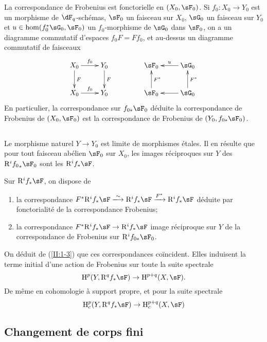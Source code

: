 La correspondance de Frobenius est fonctorielle en $(X_0,\sF_0)$. Si 
$f_0:X_0\to Y_0$ est un morphisme de $\dF_q$-schémas, $\sF_0$ un faisceau sur 
$X_0$, $\sG_0$ un faisceau sur $Y_0$ et $u\in\hom(f_0^*\sG_0,\sF_0)$ un 
$f_0$-morphisme de $\sG_0$ dans $\sF_0$, on a un diagramme commutatif d'espaces 
$f_0 F = F f_0$, et au-dessus un diagramme commutatif de faisceaux 
\[\xymatrix{
  X_0 \ar[r]^-{f_0} \ar[d]^-F
    & Y_0 \ar[d]^-F \\
  X_0 \ar[r]^-{f_0} 
    & Y_0
}\qquad\qquad
\xymatrix{
  \sF_0 
    & \ar[l]_-u \sG_0 \\
  \sF_0 \ar[u]_-{F^*} 
    & \ar[l] \sG_0 \ar[u]_-{F^*}
}\]
En particulier, la correspondance sur $f_{0*}\sF_0$ déduite la correspondance 
de Frobenius de $(X_0,\sF_0)$ est la correspondance de Frobenius de 
$(Y_0,f_{0*}\sF_0)$. 





\subsection{}\label{II:1-4}

Le morphisme naturel $Y\to Y_0$ est limite de morphismes étales. Il en 
résulte que pour tout faisceau abélien $\sF_0$ sur $X_0$, les images 
réciproques sur $Y$ des $\eR^i {f_0}_*\sF_0$ sont les $\eR^i f_*\sF$. 

Sur $\eR^if_*\sF$, on dispose de 
\begin{enumerate}[\indent a)]
  \item la correspondance 
    $F^*\eR^i f_*\sF \iso \eR^i f_*\sF \xrightarrow{F^*} \eR^if_*\sF$ déduite 
    par fonctorialité de la correspondance Frobenius; 
  \item la correspondance $F^*\eR^if_*\sF\to\eR^if_*\sF$ image réciproque sur 
    $Y$ de la correspondance de Frobenius sur $\eR^i f_{0*}\sF_0$. 
\end{enumerate}

On déduit de (\ref{II:1-3}) que ces correspondances coïncident. Elles 
induisent la terme initial d'une action de Frobenius sur toute la suite 
spectrale 
\[
  \h^p(Y,\eR^q f_*\sF) \rightarrow \h^{p+q}(X,\sF) \text{.}
\]
De même en cohomologie à support propre, et pour la suite spectrale 
\[
  \h_c^p(Y,\eR^q f_* \sF) \rightarrow \h_c^{p+q}(X,\sF)
\]





\subsection{Changement de corps fini}\label{II:1-5}

